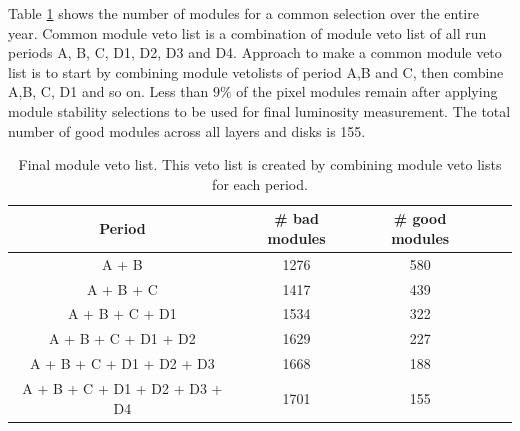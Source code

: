 
Table \ref{tab:2commonveto} shows the number of modules for a common selection over the entire year. Common module veto list is a combination of module veto list of all run periods A, B, C, D1, D2, D3 and D4. Approach to make a common module veto list is to start by combining module vetolists of period A,B and C, then combine A,B, C, D1 and so on. Less than $9\%$ of the pixel modules remain after applying module stability selections to be used for final luminosity measurement. The total number of good modules across all layers and disks is 155.

\begin{table}
  \begin{center}
    \caption[Common module veto list]{Final module veto list. This veto list is created by combining module veto lists for each period.}
    \begin{tabular}{ccccc}  
      \textbf{Period}   & \textbf{\# bad modules} & \textbf{\# good modules} \\  \hline
      A + B  & 1276 & 580 \\
     A + B + C      &  1417   &  439    \\  
     A + B + C + D1      &   1534  &   322    \\ 
     A + B + C + D1 + D2      &   1629 &    227   \\ 
     A + B + C + D1 + D2 + D3     &   1668 &   188    \\ 
     A + B + C + D1 + D2 + D3 + D4     &  1701 &     155  \\ 
      \end{tabular}
    \label{tab:2commonveto}
  \end{center}
\end{table}


